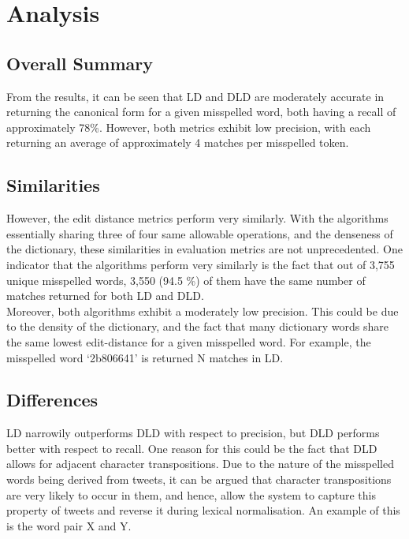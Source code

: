 \documentclass[11pt]{article}
\begin{document}
\section{Analysis}


\subsection{Overall Summary}
From the results, it can be seen that LD and DLD are moderately accurate in returning the canonical form for a given misspelled word, both having a recall of approximately 78\%. However, both metrics exhibit low precision, with each returning an average of approximately 4 matches per misspelled token.


\subsection{Similarities}
However, the edit distance metrics perform very similarly. With the algorithms essentially sharing three of four same allowable operations, and the denseness of the dictionary, these similarities in evaluation metrics are not unprecedented. One indicator that the algorithms perform very similarly is the fact that out of 3,755 unique misspelled words, 3,550 (94.5 \%) of them have the same number of matches returned for both LD and DLD.
\\

Moreover, both algorithms exhibit a moderately low precision. This could be due to the density of the dictionary, and the fact that many dictionary words share the same lowest edit-distance for a given misspelled word. For example, the misspelled word `2b806641' is returned N matches in LD.


\subsection{Differences}

LD narrowily outperforms DLD with respect to precision, but DLD performs better with respect to recall. One reason for this could be the fact that  DLD allows for adjacent character transpositions. Due to the nature of the misspelled words being derived from tweets, it can be argued that character transpositions are very likely to occur in them, and hence, allow the system to capture this property of tweets and reverse it during lexical normalisation. An example of this is the word pair X and Y.
\\
\end{document}
